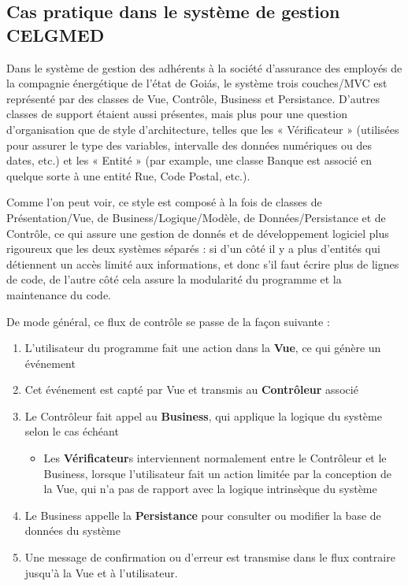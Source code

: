 \subsection{Cas pratique dans le système de gestion CELGMED}\label{section-flux}

Dans le système de gestion des adhérents à la société d'assurance des employés de la compagnie énergétique de l'état de Goiás, le système trois couches/MVC est représenté par des classes de Vue, Contrôle, Business et Persistance. D'autres classes de support étaient aussi présentes, mais plus pour une question d'organisation que de  style d'architecture, telles que les  « Vérificateur » (utilisées pour assurer le type des variables, intervalle des données numériques ou des dates, etc.) et les « Entité » (par example, une classe Banque est associé en quelque sorte à une entité Rue, Code Postal, etc.). 

Comme l'on peut voir, ce style est composé à la fois de classes de Présentation/Vue, de Business/Logique/Modèle, de Données/Persistance et de Contrôle, ce qui assure une gestion de donnés et de développement logiciel plus rigoureux que les deux systèmes séparés : si d'un côté il y a plus d'entités qui détiennent un accès limité aux informations, et donc s'il faut écrire plus de lignes de code, de l'autre côté cela assure la modularité du programme et la maintenance du code.

De mode général, ce flux de contrôle se passe de la façon suivante :

\begin{enumerate}
\item L'utilisateur du programme fait une action dans la \textbf{Vue}, ce qui génère un événement
\item Cet événement est capté par Vue et transmis au \textbf{Contrôleur} associé
\item Le Contrôleur fait appel au \textbf{Business}, qui applique la logique du système selon le cas échéant
\begin{itemize}
\item Les \textbf{Vérificateur}s interviennent normalement entre le Contrôleur et le Business, lorsque l'utilisateur fait un action limitée par la conception de la Vue, qui n'a pas de rapport avec la logique intrinsèque du système
\end{itemize}
\item Le Business appelle la \textbf{Persistance} pour consulter ou modifier la base de données du système
\item Une message de confirmation ou d'erreur est transmise dans le flux contraire jusqu'à la Vue et à l'utilisateur.
\end{enumerate}

